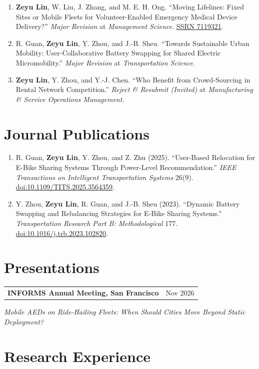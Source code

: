 \documentclass[11pt,letterpaper]{article}
\makeatletter
\newcommand{\entry}[3]{%
  \Needspace{4\baselineskip}%
  \begin{tabularx}{\linewidth}{@{}Xr@{}}
    \textbf{#1} & {\small #2}
  \end{tabularx}\par
  {\small\itshape #3\par}
}
\newcommand{\me}{\textbf{Zeyu Lin}}
\makeatother
\begin{document}
\begin{enumerate}
  \item \me, W. Liu, J. Zhang, and M. E. H. Ong. ``Moving Lifelines: Fixed Sites or Mobile Fleets for Volunteer-Enabled Emergency Medical Device Delivery?''
    \textit{Major Revision} at \textit{Management Science}. \href{https://papers.ssrn.com/sol3/papers.cfm?abstract_id=7119321}{SSRN 7119321}.
  \item R. Guan, \me, Y. Zhou, and J.-B. Sheu. ``Towards Sustainable Urban Mobility: User-Collaborative Battery Swapping for Shared Electric Micromobility.''
    \textit{Major Revision} at \textit{Transportation Science}.
  \item \me, Y. Zhou, and Y.-J. Chen. ``Who Benefit from Crowd-Sourcing in Rental Network Competition.''
    \textit{Reject \& Resubmit (Invited)} at \textit{Manufacturing \& Service Operations Management}.
\end{enumerate}

\section*{Journal Publications}

\begin{enumerate}[resume]
  \item R. Guan, \me, Y. Zhou, and Z. Zhu (2025). ``User-Based Relocation for E-Bike Sharing Systems Through Power-Level Recommendation.''
    \textit{IEEE Transactions on Intelligent Transportation Systems} 26(9). \href{https://doi.org/10.1109/TITS.2025.3564359}{doi:10.1109/TITS.2025.3564359}.
  \item Y. Zhou, \me, R. Guan, and J.-B. Sheu (2023). ``Dynamic Battery Swapping and Rebalancing Strategies for E-Bike Sharing Systems.''
    \textit{Transportation Research Part B: Methodological} 177. \href{https://doi.org/10.1016/j.trb.2023.102820}{doi:10.1016/j.trb.2023.102820}.
\end{enumerate}

\section*{Presentations}

\entry{INFORMS Annual Meeting, San Francisco}{Nov 2026}
  {Mobile AEDs on Ride-Hailing Fleets: When Should Cities Move Beyond Static Deployment?}

\section*{Research Experience}
\end{document}
